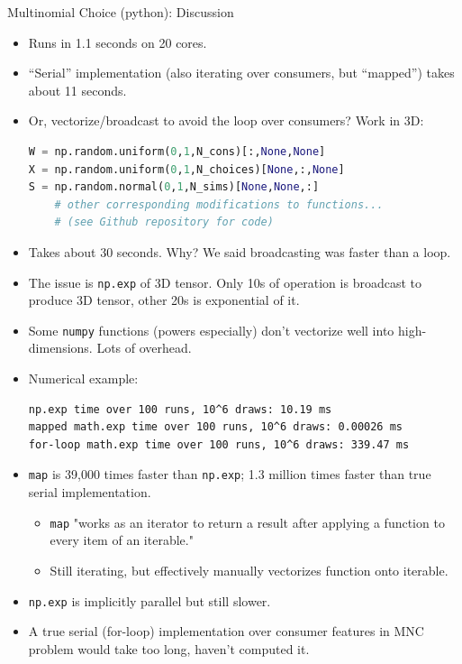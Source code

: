 \documentclass[aspectratio=1610,handout]{beamer}
\begin{document}
\begin{frame}{Multinomial Choice (python): Discussion}
    \begin{itemize}
        \item Runs in 1.1 seconds on 20 cores.
        \item ``Serial'' implementation (also iterating over consumers, but ``mapped'') takes about 11 seconds.
        \item Or, vectorize/broadcast to avoid the loop over consumers? Work in 3D: 
        \begin{lstlisting}[language=Python]
W = np.random.uniform(0,1,N_cons)[:,None,None]
X = np.random.uniform(0,1,N_choices)[None,:,None]
S = np.random.normal(0,1,N_sims)[None,None,:]
    # other corresponding modifications to functions...
    # (see Github repository for code)
        \end{lstlisting}
        \item Takes about 30 seconds.  Why?  We said broadcasting was faster than a loop.
        \item The issue is \verb|np.exp| of 3D tensor.  Only 10s of operation is broadcast to produce 3D tensor, other 20s is exponential of it.

        \newpage
        \item Some \verb|numpy| functions (powers especially) don't vectorize well into high-dimensions. Lots of overhead.
        \item Numerical example:
        \begin{verbatim}
np.exp time over 100 runs, 10^6 draws: 10.19 ms
mapped math.exp time over 100 runs, 10^6 draws: 0.00026 ms     
for-loop math.exp time over 100 runs, 10^6 draws: 339.47 ms
        \end{verbatim}
        \item  \verb|map| is 39,000 times faster than \verb|np.exp|; 1.3 million times faster than true serial implementation.
        \begin{itemize}
            \item \verb|map| "works as an iterator to return a result after applying a function to every item of an iterable."
            \item Still iterating, but effectively manually vectorizes function onto iterable.
        \end{itemize}
        \item \verb|np.exp| is implicitly parallel but still slower.
        \item A true serial (for-loop) implementation over consumer features in MNC problem would take too long, haven't computed it.


\end{itemize}
\end{frame}
\end{document}
